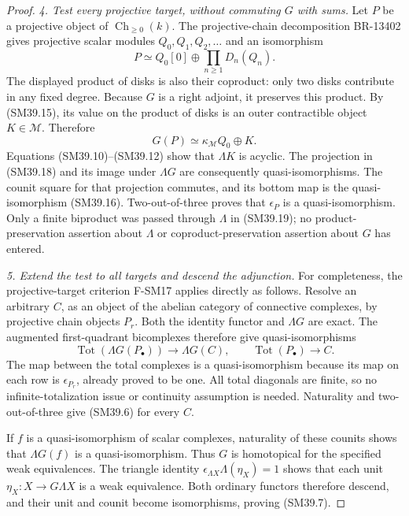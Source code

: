 \begin{proof}
\emph{4. Test every projective target, without commuting \(G\) with sums.}
Let \(P\) be a projective object of
\(\operatorname{Ch}_{\ge0}(k)\).  The projective-chain
decomposition BR-13402 gives projective scalar modules
\(Q_0,Q_1,Q_2,\ldots\) and an isomorphism
\[
          P\simeq Q_0[0]\oplus\prod_{n\ge1}D_n(Q_n).
                                                               \tag{SM39.18}
\]
The displayed product of disks is also their coproduct:
only two disks contribute in any fixed degree.
Because \(G\) is a right adjoint, it preserves this product.
By (SM39.15), its value on the product of disks is an outer
contractible object \(K\in\mathcal M\).  Therefore
\[
                 G(P)\simeq\kappa_{\mathcal M}Q_0\oplus K.
                                                               \tag{SM39.19}
\]
Equations (SM39.10)--(SM39.12) show that \(\Lambda K\) is
acyclic.  The projection in (SM39.18) and its image under
\(\Lambda G\) are consequently quasi-isomorphisms.  The
counit square for that projection commutes, and its bottom
map is the quasi-isomorphism (SM39.16).  Two-out-of-three
proves that \(\epsilon_P\) is a quasi-isomorphism.
Only a finite biproduct was passed through \(\Lambda\) in
(SM39.19); no product-preservation assertion about
\(\Lambda\) or coproduct-preservation assertion about \(G\)
has entered.

\emph{5. Extend the test to all targets and descend the adjunction.}
For completeness, the projective-target criterion F-SM17
applies directly as follows.  Resolve an arbitrary \(C\),
as an object of the abelian category of connective
complexes, by projective chain objects \(P_r\).
Both the identity functor and \(\Lambda G\) are exact.
The augmented first-quadrant bicomplexes therefore give
quasi-isomorphisms
\[
 \operatorname{Tot}(\Lambda G(P_\bullet))\longrightarrow\Lambda G(C),
 \qquad
 \operatorname{Tot}(P_\bullet)\longrightarrow C.
\]
The map between the total complexes is a quasi-isomorphism
because its map on each row is \(\epsilon_{P_r}\), already
proved to be one.  All total diagonals are finite, so no
infinite-totalization issue or continuity assumption is
needed.  Naturality and two-out-of-three give (SM39.6) for
every \(C\).

If \(f\) is a quasi-isomorphism of scalar complexes,
naturality of these counits shows that \(\Lambda G(f)\)
is a quasi-isomorphism.  Thus \(G\) is homotopical for the
specified weak equivalences.  The triangle identity
\(\epsilon_{\Lambda X}\Lambda(\eta_X)=1\) shows that
each unit \(\eta_X:X\to G\Lambda X\) is a weak
equivalence.  Both ordinary functors therefore descend,
and their unit and counit become isomorphisms, proving
(SM39.7).
\end{proof}

